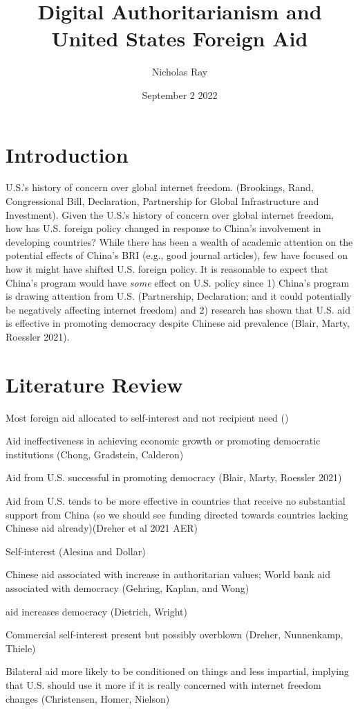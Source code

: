 \documentclass{article}
\title{\vspace{-2cm}Digital Authoritarianism and United States Foreign Aid\vspace{-0.5cm}}
\author{Nicholas Ray}
\date{\vspace{-0.5cm}September 2 2022\vspace{-1cm}}
\begin{document}
\maketitle
\section*{Introduction}
U.S.'s history of concern over global internet freedom. (Brookings, Rand, Congressional Bill, Declaration, Partnership for Global Infrastructure and Investment).
Given the U.S.'s history of concern over global internet freedom, how has U.S. foreign policy changed in response to China's involvement in developing countries? 
While there has been a wealth of academic attention on the potential effects of China's BRI (e.g., good journal articles), few have focused on how it might have shifted U.S. foreign policy. It is reasonable to expect that China's program would have \textit{some} effect on U.S. policy since 1) China's program is drawing attention from U.S. (Partnership, Declaration; and it could potentially be negatively affecting internet freedom) and 2) research has shown that U.S. aid is effective in promoting democracy despite Chinese aid prevalence (Blair, Marty, Roessler 2021).

\section*{Literature Review}
Most foreign aid allocated to self-interest and not recipient need (\cite{hoeffler_need_2011})

Aid ineffectiveness in achieving economic growth or promoting democratic institutions (Chong, Gradstein, Calderon)

Aid from U.S. successful in promoting democracy (Blair, Marty, Roessler 2021)

Aid from U.S. tends to be more effective in countries that receive no substantial support from China (so we should see funding directed towards countries lacking Chinese aid already)(Dreher et al 2021 AER)

Self-interest (Alesina and Dollar)

Chinese aid associated with increase in authoritarian values; World bank aid associated with democracy (Gehring, Kaplan, and Wong)

aid increases democracy (Dietrich, Wright)

Commercial self-interest present but possibly overblown (Dreher, Nunnenkamp, Thiele)

Bilateral aid more likely to be conditioned on things and less impartial, implying that U.S. should use it more if it is really concerned with internet freedom changes (Christensen, Homer, Nielson)
\end{document}
